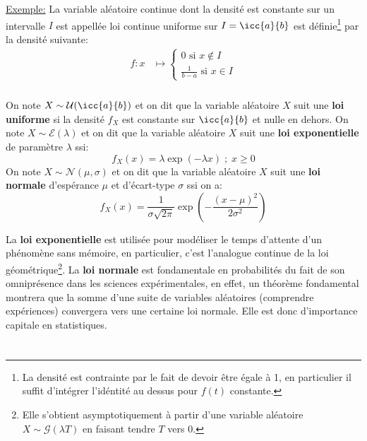 \underline{Exemple:} La variable aléatoire continue dont la densité est constante sur
un intervalle \(I\)  est appellée loi continue uniforme sur \(I = \icc{a}{b}\) est définie\footnote[2]{La densité est contrainte par le fait de devoir être égale à 1, en particulier il suffit d'intégrer l'idéntité au dessus pour \(f(t)\) constante.} par la densité suivante:
\[
   \begin{aligned}
      f: x &\longmapsto \begin{cases}
         0 \text{ si } x  \notin I\\
         \frac{1}{b - a} \text{ si } x \in I
      \end{cases}
   \end{aligned}
\]

\subsection*{}

On note \(X \sim \mathcal{U}(\icc{a}{b})\) et on dit que la variable aléatoire \(X\) suit une \textbf{loi uniforme} si la densité \(f_X\) est constante sur \(\icc{a}{b}\) et nulle en dehors.\+
On note \(X \sim \mathcal{E}(\lambda)\) et on dit que la variable aléatoire \(X\) suit une \textbf{loi exponentielle} de paramètre \(\lambda\) ssi:
\[
   f_X(x) = \lambda\exp{(-\lambda x)} \; ; \; x \geq 0  
\]
On note \(X \sim \mathcal{N}(\mu, \sigma)\) et on dit que la variable aléatoire \(X\) suit une \textbf{loi normale} d'espérance \(\mu\) et d'écart-type \(\sigma\) ssi on a:
\[
   f_X(x) = \frac{1}{\sigma\sqrt{2\pi}} \exp{\left(-\frac{(x - \mu)^2}{2\sigma^2}\right)}
\]


La \textbf{loi exponentielle} est utilisée pour modéliser le temps d'attente d'un phénomène sans mémoire, en particulier, c'est l'analogue continue de la loi géométrique\footnote[1]{Elle s'obtient asymptotiquement à partir d'une variable aléatoire \(X \sim \mathcal{G}(\lambda T)\) en faisant tendre \(T\) vers 0.}. \+
La \textbf{loi normale} est fondamentale en probabilités du fait de son omniprésence dans les sciences expérimentales, en effet, un théorème fondamental montrera que la somme d'une suite de variables aléatoires (comprendre expériences) convergera vers une certaine loi normale. Elle est donc d'importance capitale en statistiques.\+

\chapter*{} %

